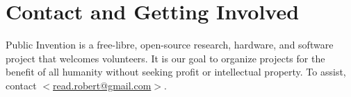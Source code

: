 \documentclass[11pt]{article}
\begin{document}
\section{Contact and Getting Involved}

Public Invention
is a free-libre, open-source research, hardware, and software project that welcomes volunteers.
It is our goal to organize projects for the benefit of all humanity without seeking profit or intellectual property.
To assist, contact \href{mailto:read.robert@gmail.com}{$<$read.robert@gmail.com$>$}.



\end{document}

